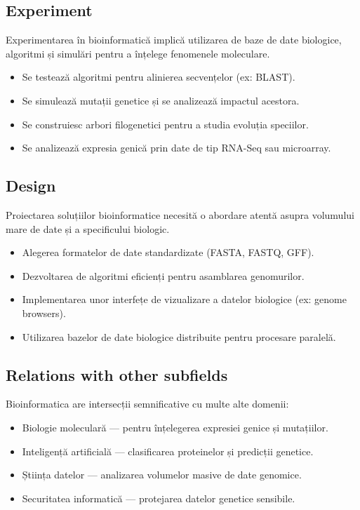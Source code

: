 \documentclass[12pt, letterpaper]{article}
\begin{document}
\subsection*{Experiment}
Experimentarea în bioinformatică implică utilizarea de baze de date biologice, algoritmi și simulări pentru a înțelege fenomenele moleculare.
\begin{itemize}
    \item Se testează algoritmi pentru alinierea secvențelor (ex: BLAST).
    \item Se simulează mutații genetice și se analizează impactul acestora.
    \item Se construiesc arbori filogenetici pentru a studia evoluția speciilor.
    \item Se analizează expresia genică prin date de tip RNA-Seq sau microarray.
\end{itemize}

\subsection*{Design}
Proiectarea soluțiilor bioinformatice necesită o abordare atentă asupra volumului mare de date și a specificului biologic.
\begin{itemize}
    \item Alegerea formatelor de date standardizate (FASTA, FASTQ, GFF).
    \item Dezvoltarea de algoritmi eficienți pentru asamblarea genomurilor.
    \item Implementarea unor interfețe de vizualizare a datelor biologice (ex: genome browsers).
    \item Utilizarea bazelor de date biologice distribuite pentru procesare paralelă.
\end{itemize}

\subsection*{Relations with other subfields}
Bioinformatica are intersecții semnificative cu multe alte domenii:
\begin{itemize}
    \item Biologie moleculară — pentru înțelegerea expresiei genice și mutațiilor.
    \item Inteligență artificială — clasificarea proteinelor și predicții genetice.
    \item Știința datelor — analizarea volumelor masive de date genomice.
    \item Securitatea informatică — protejarea datelor genetice sensibile.
\end{itemize}
\end{document}
